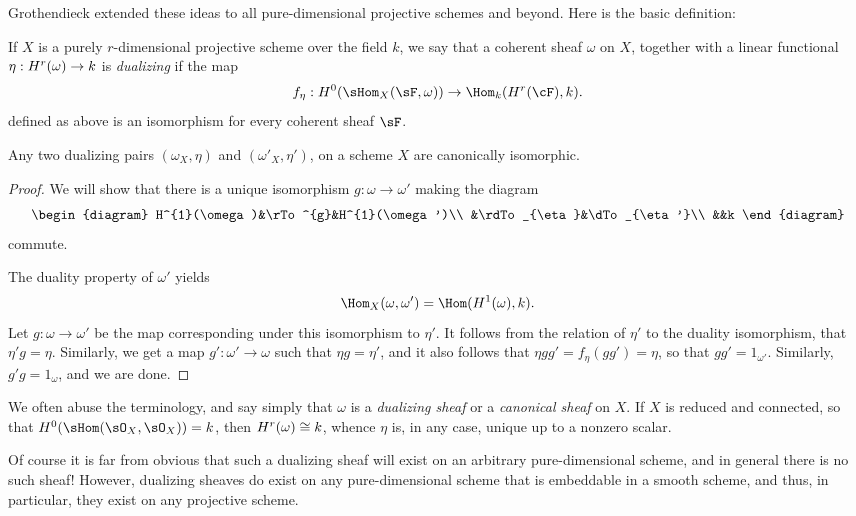 Grothendieck extended these ideas to all pure-dimensional projective schemes and beyond. Here is the basic definition:

\begin{definition}
If $X$ is a purely $r$-dimensional projective scheme over the field $k$, we say that a coherent sheaf $\omega$ on $X$, together with a linear
functional $\eta:{H}^{r}(\omega) \to k$ is \emph{dualizing} if the map
$$
f_{\eta}: \HH^{0}(\sHom_{X}(\sF, \omega))
\to
\Hom_{k}(\HH^{r}(\cF), k).
$$
defined as above is an isomorphism for every coherent sheaf $\sF$.
\end{definition}

\begin{proposition} Any two dualizing pairs $(\omega_{X}, \eta)$ and $(\omega'_{X}, \eta')$, on a scheme $X$ are canonically isomorphic.
\end{proposition}

\begin{proof}
We will show that there is a unique isomorphism $g: \omega\to \omega'$ making the diagram
$$
\begin{diagram}
 H^{1}(\omega)&\rTo^{g}&H^{1}(\omega')\\
 &\rdTo_{\eta}&\dTo_{\eta'}\\
 &&k
\end{diagram}
$$
commute. 

 The duality property of $\omega'$ yields
$$
\Hom_{X}(\omega, \omega')  = \Hom(\HH^{1}(\omega), k).
$$
Let $g: \omega \to \omega'$ be the map corresponding under this isomorphism to $\eta'$. It follows from the relation of $\eta'$ to the duality isomorphism, that 
$\eta'g = \eta$. Similarly, we get a map $g':\omega'\to \omega$ such that
$\eta g = \eta'$, and it also follows that $\eta gg' = f_{\eta}(gg') =  \eta$, so that
$gg' = 1_{\omega'}$. Similarly, $g'g = 1_{\omega}$, and we are done.
\end{proof}
 
We often abuse the terminology, and say simply that $\omega$ is a \emph{dualizing sheaf} or a \emph {canonical sheaf} on $X$. If $X$ is reduced and connected, so that $\HH^{0} (\sHom(\sO_{X} , \sO_{X})) = k$, then
${H}^{r}(\omega) \cong k$, whence $\eta$ is, in any case, unique up to a nonzero scalar. 

Of course it is far from obvious that such a dualizing sheaf will exist on an arbitrary pure-dimensional scheme, and in general there is no such sheaf! However, dualizing sheaves do exist on any pure-dimensional scheme that is embeddable in a smooth scheme, and thus, in particular, they exist on any projective scheme.

